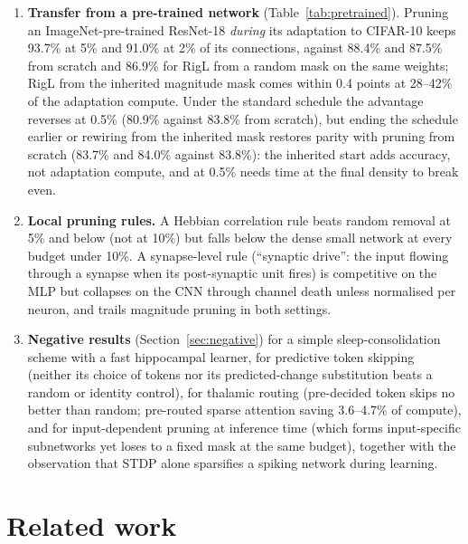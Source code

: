 \documentclass[11pt]{article}
\begin{document}
\begin{enumerate}
  on ResNet-18. On CNNs, equal connection counts are not equal
  FLOPs; constraining the layer-wise allocation to the ERK pattern, which uses fewer inference FLOPs than the dense small
  network, still leaves a 4.2-point advantage at 1\%.
  \item \textbf{Transfer from a pre-trained network} (Table~\ref{tab:pretrained}). Pruning an ImageNet-pre-trained
  ResNet-18 \emph{during} its adaptation to CIFAR-10 keeps 93.7\% at 5\% and 91.0\% at 2\% of its connections, against
  88.4\% and 87.5\% from scratch and 86.9\% for RigL from a random mask on the same weights; RigL from the inherited
  magnitude mask comes within 0.4 points at 28--42\% of the adaptation compute. Under the standard schedule the advantage
  reverses at 0.5\% (80.9\% against 83.8\% from scratch), but ending the schedule earlier or rewiring from the inherited
  mask restores parity with pruning from scratch (83.7\% and 84.0\% against 83.8\%): the inherited start adds accuracy,
  not adaptation compute, and at 0.5\% needs time at the final density to break even.
  \item \textbf{Local pruning rules.} A Hebbian correlation rule beats random removal at 5\% and below (not at 10\%) but
  falls below the dense small network at every budget under 10\%. A synapse-level rule
  (``synaptic drive'': the input flowing through a synapse when its post-synaptic unit fires) is competitive on the MLP but
  collapses on the CNN through channel death unless normalised per neuron, and trails magnitude pruning in both settings.
  \item \textbf{Negative results} (Section~\ref{sec:negative}) for a simple sleep-consolidation scheme with a fast hippocampal
  learner, for predictive token skipping (neither its choice of tokens nor its predicted-change substitution beats a random
  or identity control), for thalamic routing (pre-decided token skips no better than random; pre-routed sparse attention
  saving 3.6--4.7\% of compute), and for input-dependent pruning at inference time (which forms input-specific subnetworks yet
  loses to a fixed mask at the same budget), together with the observation that STDP alone sparsifies a spiking network
  during learning.
\end{enumerate}

\section{Related work}
\end{document}
